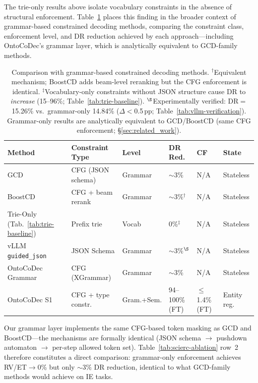 The trie-only results above isolate vocabulary constraints in the absence of structural enforcement.
Table~\ref{tab:gcd-comparison} places this finding in the broader context of grammar-based constrained decoding methods, comparing the constraint class, enforcement level, and DR reduction achieved by each approach---including OntoCoDec's grammar layer, which is analytically equivalent to GCD-family methods.

\begin{table}[t]
\centering
\small
\begin{tabular}{@{}l l l l l l@{}}
\toprule
\textbf{Method} & \textbf{Constraint Type} & \textbf{Level} & \textbf{DR Red.} & \textbf{CF} & \textbf{State} \\
\midrule
GCD~\cite{geng2023gcd} & CFG (JSON schema) & Grammar & ${\sim}$3\% & N/A & Stateless \\
BoostCD~\cite{boostcd2025} & CFG + beam rerank & Grammar & ${\sim}$3\%$^\dagger$ & N/A & Stateless \\
Trie-Only (Tab.~\ref{tab:trie-baseline}) & Prefix trie & Vocab & 0\%$^\ddagger$ & N/A & Stateless \\
\midrule
vLLM \texttt{guided\_json}~\cite{kwon2023vllm} & JSON Schema & Grammar & ${\sim}$3\%$^\S$ & N/A & Stateless \\
\midrule
OntoCoDec Grammar & CFG (XGrammar) & Grammar & ${\sim}$3\% & N/A & Stateless \\
OntoCoDec S1 & CFG + type constr. & Gram.+Sem. & 94--100\% (FT) & ${\leq}$1.4\% (FT) & Entity reg. \\
\bottomrule
\end{tabular}
\caption{Comparison with grammar-based constrained decoding methods.
$^\dagger$Equivalent mechanism; BoostCD adds beam-level reranking but the CFG enforcement is identical.
$^\ddagger$Vocabulary-only constraints without JSON structure cause DR to \emph{increase} (15--96\%; Table~\ref{tab:trie-baseline}).
$^\S$Experimentally verified: DR${=}$15.26\% vs.\ grammar-only 14.84\% ($\Delta{<}$0.5\,pp; Table~\ref{tab:vllm-verification}).
Grammar-only results are analytically equivalent to GCD/BoostCD (same CFG enforcement; \S\ref{sec:related_work}).}
\label{tab:gcd-comparison}
\end{table}

Our grammar layer implements the same CFG-based token masking as GCD and BoostCD---the mechanisms are formally identical (JSON schema $\to$ pushdown automaton $\to$ per-step allowed token set).
Table~\ref{tab:scierc-ablation} row~2 therefore constitutes a direct comparison: grammar-only enforcement achieves RV/ET$\to$0\% but only ${\sim}$3\% DR reduction, identical to what GCD-family methods would achieve on IE tasks.

